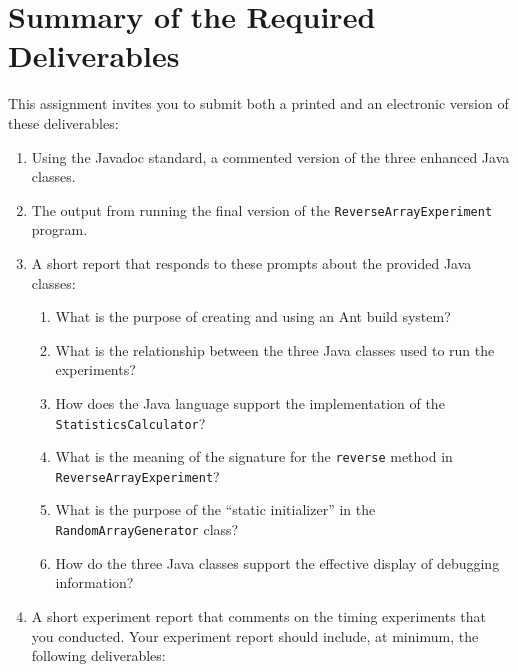 \section*{Summary of the Required Deliverables}

This assignment invites you to submit both a printed and an electronic version of these deliverables:

\vspace*{-.05in}
\begin{enumerate}

  \itemsep 0em
  \item Using the Javadoc standard, a commented version of the three enhanced Java classes.

  \item The output from running the final version of the {\tt ReverseArrayExperiment} program.

  \item A short report that responds to these prompts about the provided Java classes:

    \vspace*{-.05in}
    \begin{enumerate}
      \itemsep 0em

      \item What is the purpose of creating and using an Ant build system?

      \item What is the relationship between the three Java classes used to run the experiments?

      \item How does the Java language support the implementation of the {\tt StatisticsCalculator}?

      \item What is the meaning of the signature for the {\tt reverse} method in {\tt ReverseArrayExperiment}?

      \item What is the purpose of the ``static initializer'' in the {\tt RandomArrayGenerator} class?

      \item How do the three Java classes support the effective display of debugging information?

    \end{enumerate}

  \item A short experiment report that comments on the timing experiments that you conducted. Your experiment report
    should include, at minimum, the following deliverables:


\end{enumerate}
